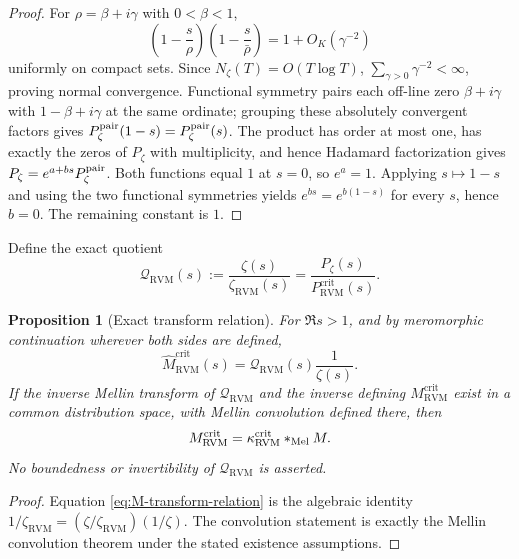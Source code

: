 \documentclass[11pt,reqno]{amsart}
\newtheorem{proposition}[theorem]{Proposition}
\theoremstyle{definition}
\theoremstyle{remark}
\newcommand{\Mell}{*_{\rm Mel}}
\newcommand{\RVM}{\mathrm{RVM}}
\newcommand{\crit}{\mathrm{crit}}
\begin{document}
\begin{proof}
For $\rho=\beta+i\gamma$ with $0<\beta<1$,
\[
 \left(1-\frac{s}{\rho}\right)
 \left(1-\frac{s}{\bar\rho}\right)
 =1+O_K(\gamma^{-2})
\]
uniformly on compact sets.  Since $N_\zeta(T)=O(T\log T)$,
$\sum_{\gamma>0}\gamma^{-2}<\infty$, proving normal convergence.  Functional symmetry pairs each off-line zero $\beta+i\gamma$ with $1-\beta+i\gamma$ at the same ordinate; grouping these absolutely convergent factors gives
$P_\zeta^{\rm pair}(1-s)=P_\zeta^{\rm pair}(s)$.  The product has order at most one, has exactly the zeros of $P_\zeta$ with multiplicity, and hence Hadamard factorization gives
$P_\zeta=e^{a+bs}P_\zeta^{\rm pair}$.  Both functions equal $1$ at $s=0$, so $e^a=1$.  Applying $s\mapsto1-s$ and using the two functional symmetries yields $e^{bs}=e^{b(1-s)}$ for every $s$, hence $b=0$.  The remaining constant is $1$.
\end{proof}

Define the exact quotient
\begin{equation}\label{eq:Q-RVM}
 \boxed{
 \mathcal Q_{\RVM}(s)
 :=\frac{\zeta(s)}{\zeta_{\RVM}(s)}
 =\frac{P_\zeta(s)}{P_{\RVM}^{\crit}(s)}.}
\end{equation}

\begin{proposition}[Exact transform relation]\label{prop:M-transform-relation}
For $\Re s>1$, and by meromorphic continuation wherever both sides are defined,
\begin{equation}\label{eq:M-transform-relation}
 \boxed{
 \widehat M_{\RVM}^{\crit}(s)
 =\mathcal Q_{\RVM}(s)\frac1{\zeta(s)}.}
\end{equation}
If the inverse Mellin transform of $\mathcal Q_{\RVM}$ and the inverse defining $M_{\RVM}^{\crit}$ exist in a common distribution space, with Mellin convolution defined there, then
\begin{equation}\label{eq:M-convolution}
 M_{\RVM}^{\crit}
 =\kappa_{\RVM}^{\crit}\Mell M.
\end{equation}
No boundedness or invertibility of $\mathcal Q_{\RVM}$ is asserted.
\end{proposition}

\begin{proof}
Equation \eqref{eq:M-transform-relation} is the algebraic identity
$1/\zeta_{\RVM}=(\zeta/\zeta_{\RVM})(1/\zeta)$.  The convolution statement is exactly the Mellin convolution theorem under the stated existence assumptions.
\end{proof}
\end{document}
